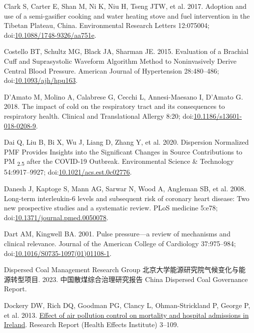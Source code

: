 \documentclass[
  letterpaper,
  DIV=11,
  numbers=noendperiod]{scrartcl}
\newlength{\cslhangindent}
\newenvironment{CSLReferences}[2] %
 {\begin{list}{}{%
  \setlength{\itemindent}{0pt}
  \setlength{\leftmargin}{0pt}
  \setlength{\parsep}{0pt}
  \ifodd #1
   \setlength{\leftmargin}{\cslhangindent}
   \setlength{\itemindent}{-1\cslhangindent}
  \fi
  \setlength{\itemsep}{#2\baselineskip}}}
 {\end{list}}
\begin{document}
\begin{CSLReferences}{1}{1}
Clark S, Carter E, Shan M, Ni K, Niu H, Tseng JTW, et al. 2017. Adoption
and use of a semi-gasifier cooking and water heating stove and fuel
intervention in the {Tibetan Plateau}, {China}. Environmental Research
Letters 12:075004;
doi:\href{https://doi.org/10.1088/1748-9326/aa751e}{10.1088/1748-9326/aa751e}.

Costello BT, Schultz MG, Black JA, Sharman JE. 2015. Evaluation of a
{Brachial Cuff} and {Suprasystolic Waveform Algorithm Method} to
{Noninvasively Derive Central Blood Pressure}. American Journal of
Hypertension 28:480--486;
doi:\href{https://doi.org/10.1093/ajh/hpu163}{10.1093/ajh/hpu163}.

D'Amato M, Molino A, Calabrese G, Cecchi L, Annesi-Maesano I, D'Amato G.
2018. The impact of cold on the respiratory tract and its consequences
to respiratory health. Clinical and Translational Allergy 8:20;
doi:\href{https://doi.org/10.1186/s13601-018-0208-9}{10.1186/s13601-018-0208-9}.

Dai Q, Liu B, Bi X, Wu J, Liang D, Zhang Y, et al. 2020. Dispersion
{Normalized PMF Provides Insights} into the {Significant Changes} in
{Source Contributions} to {PM} {\textsubscript{2.5}} after the {COVID-19
Outbreak}. Environmental Science \& Technology 54:9917--9927;
doi:\href{https://doi.org/10.1021/acs.est.0c02776}{10.1021/acs.est.0c02776}.

Danesh J, Kaptoge S, Mann AG, Sarwar N, Wood A, Angleman SB, et al.
2008. Long-term interleukin-6 levels and subsequent risk of coronary
heart disease: Two new prospective studies and a systematic review. PLoS
medicine 5:e78;
doi:\href{https://doi.org/10.1371/journal.pmed.0050078}{10.1371/journal.pmed.0050078}.

Dart AM, Kingwell BA. 2001. Pulse pressure---a review of mechanisms and
clinical relevance. Journal of the American College of Cardiology
37:975--984;
doi:\href{https://doi.org/10.1016/S0735-1097(01)01108-1}{10.1016/S0735-1097(01)01108-1}.

Dispersed Coal Management Research Group
北京大学能源研究院气候变化与能源转型项目. 2023. 中国散煤综合治理研究报告
{China Dispersed Coal Governance Report}.

Dockery DW, Rich DQ, Goodman PG, Clancy L, Ohman-Strickland P, George P,
et al. 2013. \href{https://www.ncbi.nlm.nih.gov/pubmed/24024358}{Effect
of air pollution control on mortality and hospital admissions in
{Ireland}}. Research Report (Health Effects Institute) 3--109.


\end{CSLReferences}
\end{document}
